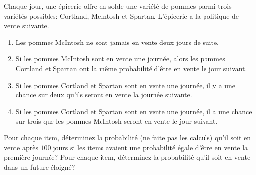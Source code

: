 \begin{question}[\eco]
Chaque jour, une épicerie offre en solde une variété de pommes parmi
trois variétés possibles: Cortland, McIntosh et Spartan.  L'épicerie
a la politique de vente suivante.
\begin{enumerate}
\item Les pommes McIntosh ne sont jamais en vente deux jours de
  suite.
\item Si les pommes McIntosh sont en vente une journée, alors les
  pommes Cortland et Spartan ont la même probabilité d'être en vente
  le jour suivant.
\item Si les pommes Cortland et Spartan sont en vente une journée, il
  y a une chance sur deux qu'ils seront en vente la journée suivante.
\item Si les pommes Cortland et Spartan sont en vente une journée, il
  a une chance sur trois que les pommes McIntosh seront en vente le
  jour suivant.
\end{enumerate}

Pour chaque item, déterminez la probabilité (ne faite pas les calculs) qu'il
soit en vente après $100$ jours si les items avaient une probabilité égale
d'être en vente la première journée?    Pour chaque item, déterminez la
probabilité qu'il soit en vente dans un future éloigné?
\label{12Q16}
\end{question}

